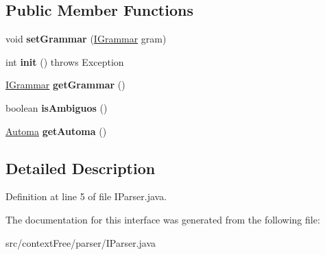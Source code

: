 \subsection*{Public Member Functions}
\begin{DoxyCompactItemize}
\item 
\hypertarget{interfacecontext_free_1_1parser_1_1_i_parser_aa0b56b8cc9bf60ddd02d5fb6a99d16bd}{void {\bfseries set\-Grammar} (\hyperlink{interfacecontext_free_1_1grammar_1_1_i_grammar}{I\-Grammar} gram)}\label{interfacecontext_free_1_1parser_1_1_i_parser_aa0b56b8cc9bf60ddd02d5fb6a99d16bd}

\item 
\hypertarget{interfacecontext_free_1_1parser_1_1_i_parser_a26c1dede13720e51bf04464b15ce1f01}{int {\bfseries init} ()  throws Exception}\label{interfacecontext_free_1_1parser_1_1_i_parser_a26c1dede13720e51bf04464b15ce1f01}

\item 
\hypertarget{interfacecontext_free_1_1parser_1_1_i_parser_a19a6f39c3ebc05c90845096a2b1c5889}{\hyperlink{interfacecontext_free_1_1grammar_1_1_i_grammar}{I\-Grammar} {\bfseries get\-Grammar} ()}\label{interfacecontext_free_1_1parser_1_1_i_parser_a19a6f39c3ebc05c90845096a2b1c5889}

\item 
\hypertarget{interfacecontext_free_1_1parser_1_1_i_parser_a29c662e040f218bfba40fb3e8c394615}{boolean {\bfseries is\-Ambiguos} ()}\label{interfacecontext_free_1_1parser_1_1_i_parser_a29c662e040f218bfba40fb3e8c394615}

\item 
\hypertarget{interfacecontext_free_1_1parser_1_1_i_parser_ad977787bef5bdc14b422945143a0414c}{\hyperlink{classcontext_free_1_1parser_1_1_automa}{Automa} {\bfseries get\-Automa} ()}\label{interfacecontext_free_1_1parser_1_1_i_parser_ad977787bef5bdc14b422945143a0414c}

\end{DoxyCompactItemize}


\subsection{Detailed Description}


Definition at line 5 of file I\-Parser.\-java.



The documentation for this interface was generated from the following file\-:\begin{DoxyCompactItemize}
\item 
src/context\-Free/parser/I\-Parser.\-java\end{DoxyCompactItemize}
